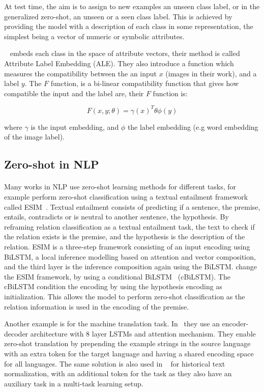 At test time, the aim is to assign to new examples an unseen class label, or in the generalized zero-shot, an unseen or a seen class label. This is achieved by providing the model with a description of each class in some representation, the simplest being a vector of numeric or symbolic attributes.

~\cite{akata2015ale} embeds each class in the space of attribute vectors, their method is called Attribute Label Embedding (ALE). They also introduce a function which measures the compatibility between the an input $x$ (images in their work), and a label $y$. The $F$ function, is a bi-linear compatibility function that gives how compatible the input and the label are,  their $F$ function is:

\begin{equation}
F(x, y ; \theta)=\gamma(x)^{T} \theta \phi(y)
\end{equation}

where $\gamma$ is the input embedding, and $\phi$ the label embedding (e.g word embedding of the image label). 

\subsection{Zero-shot in NLP}
\paragraph{}
Many works in NLP use zero-shot learning methods for different tasks, for example 
\cite{obamuyide-vlachos-2018-zero} perform zero-shot classification using a textual entailment framework called ESIM~\citep{chen-etal-2017-enhanced}. Textual entailment consists of predicting if a sentence, the premise, entails, contradicts or is neutral to another sentence, the hypothesis. By reframing relation classification as a textual entailment task, the text to check if the relation exists is the premise, and the hypothesis is the description of the relation. ESIM is a three-step framework consisting of an input encoding using BiLSTM, a local inference modelling based on attention and vector composition, and the third layer is the inference composition again using the BiLSTM. \cite{obamuyide-vlachos-2018-zero} change the ESIM framework, by using a conditional BiLSTM~\citep{rocktaschel2015reasoning} (cBiLSTM). The cBiLSTM condition the encoding by using the hypothesis encoding as initialization. This allows the model to perform zero-shot classification as the relation information is used in the encoding of the premise.

Another example is for the machine translation task. In~\citep{johnson-etal-2017-googles} they use an encoder-decoder architecture with 8 layer LSTMs and attention mechanism. They enable zero-shot translation by prepending the example strings in the source language with an extra token for the target language and having a shared encoding space for all languages. The same solution is also used in ~\citep{bollmann2019zero} for historical text normalization, with an additional token for the task as they also have an auxiliary task in a multi-task learning setup. 
